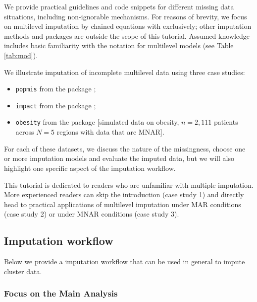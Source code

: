\documentclass[
]{jss}
\providecommand{\tightlist}{%
  \setlength{\itemsep}{0pt}\setlength{\parskip}{0pt}}
\begin{document}
We provide practical guidelines and code snippets for different missing
data situations, including non-ignorable mechanisms. For reasons of
brevity, we focus on multilevel imputation by chained equations with
 exclusively; other imputation methods and packages \citep[see
e.g.][ and \citet{grun18}]{audi18} are outside the scope of this
tutorial. Assumed knowledge includes basic familiarity with the
 notation for multilevel models (see Table \ref{tab:mod}).

We illustrate imputation of incomplete multilevel data using three case
studies:

\begin{itemize}
\tightlist
\item
  \texttt{popmis} from the  package \citep[simulated data on
  perceived popularity, \(n = 2,000\) pupils across \(N = 100\) schools
  with data that are MAR,][]{mice};
\item
  \texttt{impact} from the  package \citep[empirical data
  on traumatic brain injuries, \(n = 11,022\) patients across \(N = 15\)
  studies with data that are MAR,][]{metamisc};
\item
  \texttt{obesity} from the  package {[}simulated data on
  obesity, \(n = 2,111\) patients across \(N = 5\) regions with data
  that are MNAR{]}.
\end{itemize}

For each of these datasets, we discuss the nature of the missingness,
choose one or more imputation models and evaluate the imputed data, but
we will also highlight one specific aspect of the imputation workflow.

This tutorial is dedicated to readers who are unfamiliar with multiple
imputation. More experienced readers can skip the introduction (case
study 1) and directly head to practical applications of multilevel
imputation under MAR conditions (case study 2) or under MNAR conditions
(case study 3).

\hypertarget{imputation-workflow}{%
\subsection{Imputation workflow}\label{imputation-workflow}}

Below we provide a imputation workflow that can be used in general to
impute cluster data.

\hypertarget{focus-on-the-main-analysis}{%
\subsubsection{Focus on the Main
Analysis}\label{focus-on-the-main-analysis}}
\end{document}
